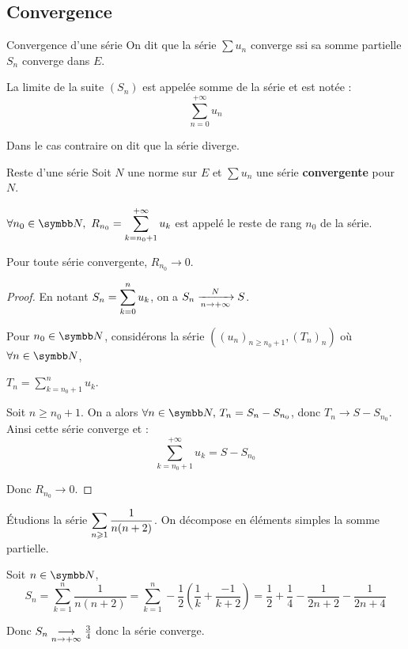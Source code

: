\subsection{Convergence}

\begin{definition}{Convergence d'une série}{}
    On dit que la série $\sum u_n$ converge ssi sa somme partielle $S_n$ converge 
    dans $E$. 

    La limite de la suite $(S_n)$ est appelée somme de la série et est notée :
    \[\sum_{n=0}^{+\infty} u_n\]

    Dans le cas contraire on dit que la série diverge.
\end{definition}

\begin{definition}{Reste d'une série}{}
    Soit $N$ une norme sur $E$ et $\sum u_n$ une série \textbf{convergente} pour $N$.

    $\ds \forall n_0 \in \N,~R_{n_0} = \sum_{k = n_0 + 1}^{+\infty} u_k$
    est appelé le reste de rang $n_0$ de la série. 
\end{definition}

\begin{proposition}{}{}
    Pour toute série convergente, $R_{n_0} \to 0$.
\end{proposition}

\begin{proof}
    En notant $\ds S_n = \sum_{k=0}^n u_k$, on a $S_n \limitnorme{N}{n}{+ \infty} S$.

    Pour $n_0 \in \N$, considérons la série $((u_n)_{n \geqslant n_0 + 1}, (T_n)_n)$ où
    $\displaystyle \forall n \in \N$, 
    
    $\displaystyle T_n = \sum_{k = n_0 + 1}^{n} u_k$. 

    Soit $n \geqslant n_0 + 1$. On a alors $\forall n \in \N, \, T_n = S_n - S_{n_0}$, 
    donc $T_n \to S - S_{n_0}$. Ainsi cette série converge et :
    \[\sum_{k = n_0 + 1}^{+\infty} u_k = S - S_{n_0}\]
    
    Donc $R_{n_0} \to 0$.
\end{proof}

\begin{exemple}
    Étudions la série $\ds\sum_{n \geqslant 1} \frac 1 {n(n+2)}$. On décompose en éléments simples la somme partielle.

    Soit $n \in \N$,
    \[S_n = \sum_{k=1}^n \frac 1 {n(n+2)} = \sum_{k=1}^n - \frac 1 2 \left( \frac 1 k + \frac {-1} {k+2}\right) = \frac 1 2 + \frac 1 4 - \frac 1 {2n+2} - \frac 1 {2n+4}\]

    Donc $S_n \limit{n}{+\infty} \frac 3 4$ donc la série converge.
\end{exemple}

